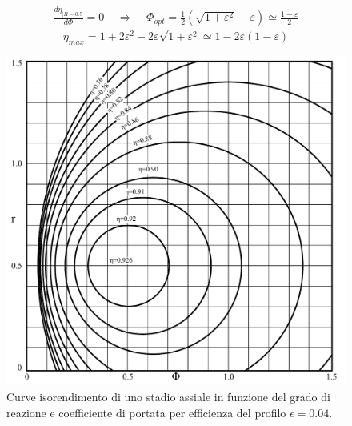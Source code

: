 \begin{align*}
\frac{d\eta_{|R=0.5}}{d \Phi} = 0 \;\;\;\; \Rightarrow \;\;\;\; \Phi_{opt} = \frac{1}{2} \left( \sqrt{1 + \varepsilon^2} - \varepsilon \right) \simeq \frac{1 - \varepsilon}{2}
\end{align*}
\begin{equation}
\eta_{max} = 1 + 2 \varepsilon^2 - 2 \varepsilon \sqrt{1 + \varepsilon^2} \simeq 1 - 2 \varepsilon \left( 1 - \varepsilon \right)
\end{equation}
\begin{figure}
\centering
  \includegraphics[width=\textwidth]{fig/IsoRendCompAss.pdf}
\caption{Curve isorendimento di uno stadio assiale in funzione del grado di reazione e coefficiente di portata per efficienza del profilo $\epsilon=0.04$.}
\label{}
\end{figure}

